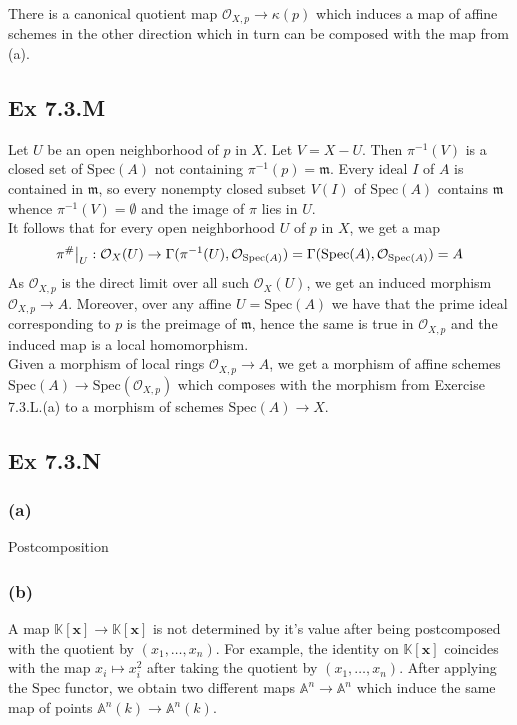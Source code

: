 \documentclass{article}
\newcommand\restr[2]{{%
  \left.\kern-\nulldelimiterspace %
  #1 %
  \vphantom{\big|} %
  \right|_{#2} %
  }}
\theoremstyle{definition}
\newcommand{\K}{\mathbb{K}}
\newcommand{\A}{\mathbb{A}}
\newcommand{\Kx}{\K[\bm{x}]}
\newcommand{\oo}{\mathcal{O}}
\newcommand{\osp}[1]{\oo_{\Spec\left(#1\right)}}
\newcommand{\An}{\A^n}
\newcommand{\Spec}{\text{Spec}}
\begin{document}
There is a canonical quotient map $\mathcal{O}_{X, p} \to \kappa(p)$ which
induces a map of affine schemes in the other direction which in turn can be composed
with the map from (a).

\subsection*{Ex 7.3.M}

Let $U$ be an open neighborhood of $p$ in $X$. Let $V = X - U$. Then
$\pi^{-1}(V)$ is a closed set of $\Spec(A)$ not containing $\pi^{-1}(p) =
	\mathfrak{m}$. Every ideal $I$ of $A$ is contained in $\mathfrak{m}$, so every
nonempty closed subset $V(I)$ of $\Spec(A)$ contains $\mathfrak{m}$ whence
$\pi^{-1}(V) = \emptyset$ and the image of $\pi$ lies in $U$. \\

It follows that for every open neighborhood $U$ of $p$ in $X$,
we get a map
\[
	\restr{\pi^{\#}}{U}
	:
	\mathcal{O}_X(U)
	\to
	\Gamma(\pi^{-1}(U), \osp{A})
	=
	\Gamma(\Spec(A), \osp{A})
	=
	A
\]
As $\mathcal{O}_{X, p}$ is the direct limit over all such $\mathcal{O}_X(U)$,
we get an induced morphism $\mathcal{O}_{X, p} \to A$. Moreover, over any
affine $U = \Spec(A)$ we have that the prime ideal corresponding to $p$ is the
preimage of $\mathfrak{m}$, hence the same is true in $\mathcal{O}_{X, p}$ and
the induced map is a local homomorphism. \\

Given a morphism of local rings $\mathcal{O}_{X,p} \to A$, we get a morphism of
affine schemes $\Spec(A) \to \Spec(\mathcal{O}_{X, p})$ which composes with the
morphism from Exercise 7.3.L.(a) to a morphism of schemes $\Spec(A) \to X$. \\

\subsection*{Ex 7.3.N}

\subsubsection*{(a)}

Postcomposition

\subsubsection*{(b)}

A map $\Kx \to \Kx$ is not determined by it's value after being postcomposed
with the quotient by $(x_{1}, \ldots, x_n)$. For example, the identity on $\Kx$
coincides with the map $x_i \mapsto x_i^{2}$ after taking the quotient by
$(x_{1}, \ldots, x_n)$. After applying the $\Spec$ functor, we obtain two
different maps $\An \to \An$ which induce the same map of points $\An(k) \to
	\An(k)$. \\
\end{document}
